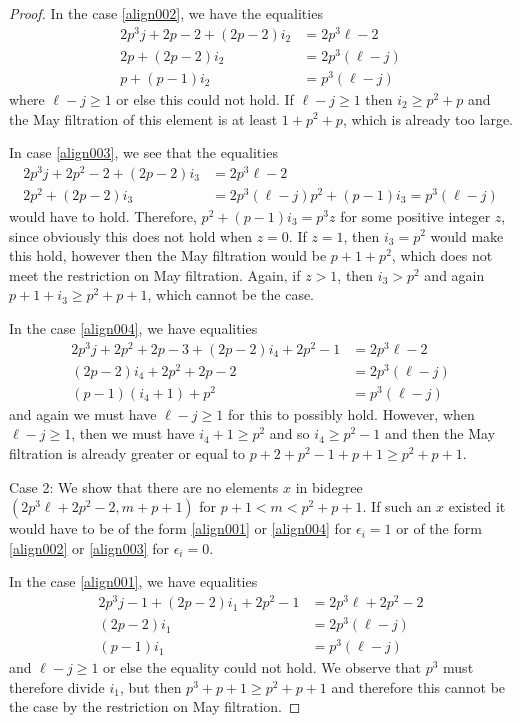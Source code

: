\begin{proof}
 In the case \eqref{align002}, we have the equalities
  \begin{align*}
 2p^3j+2p-2+(2p-2)i_2 & = 2p^3\ell-2 \\
 2p+(2p-2)i_2&=2p^3(\ell-j)\\
 p+(p-1)i_2&=p^3(\ell-j)
 \end{align*}
where $\ell-j\ge 1$ or else this could not hold. If $\ell-j\ge 1$ then $i_2\ge p^2+p$ and the May filtration of this element is at least $1+p^2+p$, which is already too large. 

In case \eqref{align003}, we see that the equalities
 \begin{align*}
 2 p^3j+2p^2-2 +(2p-2)i_3& =2p^3\ell-2 \\
  2p^2 +(2p-2)i_3& =2p^3(\ell-j)
  p^2+(p-1)i_3=p^3(\ell-j)
  \end{align*}
  would have to hold. Therefore, $p^2+(p-1)i_3=p^3z$ for some positive integer $z$, since obviously this does not hold when $z=0$. If $z=1$, then $i_3=p^2$ would make this hold, however then the May filtration would be $p+1+p^2$, which does not meet the restriction on May filtration. Again, if $z>1$, then $i_3>p^2$ and again $p+1+i_3\ge p^2+p+1$, which cannot be the case. 
  

In the case \eqref{align004}, we have equalities
\begin{align*}
2p^3j+2p^2+2p-3+(2p-2)i_4+2p^2-1&=2p^3\ell-2  \\
(2p-2)i_4+2p^2+2p-2& = 2p^3(\ell-j) \\
(p-1)(i_4+1)+p^2& =p^3(\ell-j) 
\end{align*}
and again we must have $\ell-j\ge 1$ for this to possibly hold. However, when $\ell-j\ge 1$, then we must have $i_4+1\ge p^2$ and so $i_4\ge p^2-1$ and then the May filtration is already greater or equal to $p+2+p^2-1+p+1\ge p^2+p+1$. 
 
 Case 2: We show that there are no elements  $x$ in bidegree $(2p^3\ell+2p^2-2,m+p+1)$ for $p+1<m<p^2+p+1$. If such an $x$ existed it would have to be of the form  \eqref{align001} or  \eqref{align004} for $\epsilon_i=1$ or  of the form \eqref{align002} or  \eqref{align003} for $\epsilon_i=0$.

 In the case \eqref{align001}, we have equalities
\begin{align*}
2p^3j-1+(2p-2)i_1+2p^2-1&=2p^3\ell+2p^2-2 \\
(2p-2)i_1 & = 2p^3(\ell-j) \\
(p-1)i_1& =p^3(\ell-j) 
\end{align*}
and $\ell-j\ge 1$ or else the equality could not hold. We observe that $p^3$ must therefore divide $i_1$, but then $p^3+p+1\ge p^2+p+1$ and therefore this cannot be the case by the restriction on May filtration. 


\end{proof}
